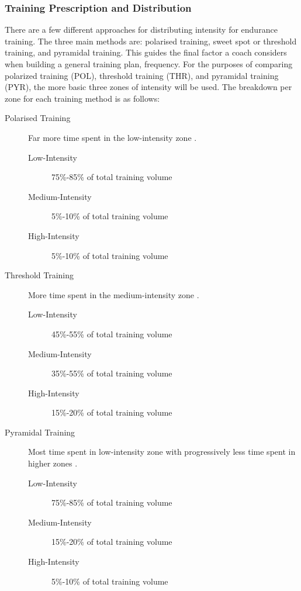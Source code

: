 \subsubsection{Training Prescription and Distribution}
There are a few different approaches for distributing intensity for endurance training. The three main methods are: polarised training, sweet spot or threshold training, and pyramidal training. This guides the final factor a coach considers when building a general training plan, frequency. For the purposes of comparing polarized training (POL), threshold training (THR), and pyramidal training (PYR), the more basic three zones of intensity will be used. The breakdown per zone for each training method is as follows:
\begin{description}
  \item[Polarised Training] Far more time spent in the low-intensity zone \autocite{Seiler2004}.

  \begin{description}
    \item[Low-Intensity] 75\%-85\% of total training volume
    \item[Medium-Intensity] 5\%-10\% of total training volume
    \item[High-Intensity] 5\%-10\% of total training volume  
  \end{description} 
  \item[Threshold Training] More time spent in the medium-intensity zone \autocite{Seiler2004}.

  \begin{description}
    \item[Low-Intensity] 45\%-55\% of total training volume
    \item[Medium-Intensity] 35\%-55\% of total training volume
    \item[High-Intensity] 15\%-20\% of total training volume  
  \end{description}
  \item[Pyramidal Training] Most time spent in low-intensity zone with progressively less time spent in higher zones \autocite{Selles2019}.

  \begin{description}
    \item[Low-Intensity] 75\%-85\% of total training volume
    \item[Medium-Intensity] 15\%-20\% of total training volume
    \item[High-Intensity] 5\%-10\% of total training volume  
  \end{description}
\end{description}

